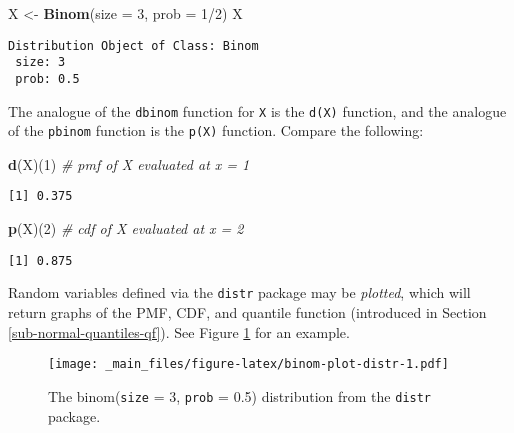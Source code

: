 \documentclass[]{book}
\newenvironment{Shaded}{\begin{snugshade}}{\end{snugshade}}
\newcommand{\KeywordTok}[1]{\textcolor[rgb]{0.13,0.29,0.53}{\textbf{{#1}}}}
\newcommand{\DataTypeTok}[1]{\textcolor[rgb]{0.13,0.29,0.53}{{#1}}}
\newcommand{\DecValTok}[1]{\textcolor[rgb]{0.00,0.00,0.81}{{#1}}}
\newcommand{\StringTok}[1]{\textcolor[rgb]{0.31,0.60,0.02}{{#1}}}
\newcommand{\CommentTok}[1]{\textcolor[rgb]{0.56,0.35,0.01}{\textit{{#1}}}}
\newcommand{\NormalTok}[1]{{#1}}
\numberwithin{equation}{chapter}
\numberwithin{figure}{chapter}
\theoremstyle{plain}
\theoremstyle{definition}
\theoremstyle{remark}
\theoremstyle{definition}
\theoremstyle{definition}
\theoremstyle{remark}
\begin{document}
\begin{Shaded}
\begin{Highlighting}[]
\NormalTok{X <-}\StringTok{ }\KeywordTok{Binom}\NormalTok{(}\DataTypeTok{size =} \DecValTok{3}\NormalTok{, }\DataTypeTok{prob =} \DecValTok{1}\NormalTok{/}\DecValTok{2}\NormalTok{)}
\NormalTok{X}
\end{Highlighting}
\end{Shaded}

\begin{verbatim}
Distribution Object of Class: Binom
 size: 3
 prob: 0.5
\end{verbatim}

The analogue of the \texttt{dbinom} function for \texttt{X} is the
\texttt{d(X)} function, and the analogue of the \texttt{pbinom} function
is the \texttt{p(X)} function. Compare the following:

\begin{Shaded}
\begin{Highlighting}[]
\KeywordTok{d}\NormalTok{(X)(}\DecValTok{1}\NormalTok{)   }\CommentTok{# pmf of X evaluated at x = 1}
\end{Highlighting}
\end{Shaded}

\begin{verbatim}
[1] 0.375
\end{verbatim}

\begin{Shaded}
\begin{Highlighting}[]
\KeywordTok{p}\NormalTok{(X)(}\DecValTok{2}\NormalTok{)   }\CommentTok{# cdf of X evaluated at x = 2}
\end{Highlighting}
\end{Shaded}

\begin{verbatim}
[1] 0.875
\end{verbatim}

Random variables defined via the \texttt{distr} package \autocite{distr}
may be \emph{plotted}, which will return graphs of the PMF, CDF, and
quantile function (introduced in Section \ref{sub-normal-quantiles-qf}).
See Figure \ref{fig:binom-plot-distr} for an example.

\begin{figure}[htbp]
\centering
\texttt{[image: \_main\_files/figure-latex/binom-plot-distr-1.pdf]}
\caption{\label{fig:binom-plot-distr}\small The \textsf{binom}(\texttt{size} = 3,
\texttt{prob} = 0.5) distribution from the \texttt{distr} package.}
\end{figure}
\end{document}
